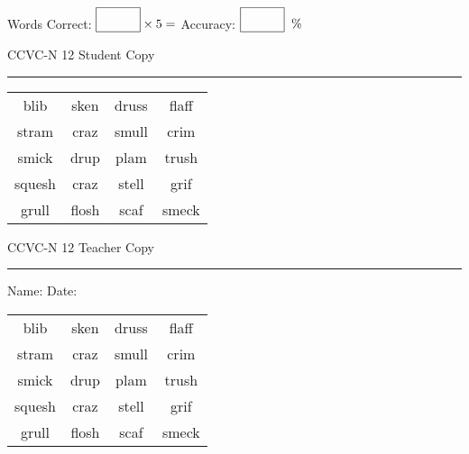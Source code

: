 \documentclass{memoir}
\begin{document}
\small

Words Correct: $\fbox{\phantom{\huge 100}} \times 5 = $ Accuracy: $\fbox{\phantom{\huge 100}}\;\; \%$ 

\vfill

\newpage


\footnotesize \noindent
CCVC-N 12 \hfill Student Copy
\smallskip
\hrule

\Large

\setlength{\tabcolsep}{14pt}
\def\arraystretch{3}

{\selectfont


\begin{vplace}[0.5]
\begin{center}
\begin{tabular}{cccc}
blib             & sken & druss & flaff \\
stram & craz       & smull & crim \\
smick & drup & plam & trush \\
squesh & craz        & stell & grif      \\
grull            & flosh & scaf & smeck \\
\end{tabular}
\end{center}
\end{vplace}

}

\newpage

\footnotesize \noindent
CCVC-N 12 \hfill Teacher Copy
\smallskip
\hrule

\small

\vfill

\noindent
Name: \underline{\hspace{1.75in}} \hfill Date: \underline{\hspace{1in}}

\Large

{\selectfont


\begin{vplace}[0.5]
\begin{center}
\begin{tabular}{cccc}
blib             & sken & druss & flaff \\
stram & craz       & smull & crim \\
smick & drup & plam & trush \\
squesh & craz        & stell & grif      \\
grull            & flosh & scaf & smeck \\
\end{tabular}
\end{center}
\end{vplace}



}
\end{document}
